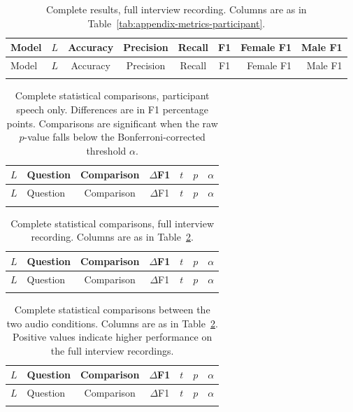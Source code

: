 \documentclass{mproj}
\begin{document}
{\small\setlength{\tabcolsep}{3pt}
\begin{longtable}{llccccrr}
  \caption{Complete results, full interview recording. Columns are as in
  Table~\ref{tab:appendix-metrics-participant}.}
  \label{tab:appendix-metrics-full} \\
  \toprule
  Model & $L$ & Accuracy & Precision & Recall & F1 & Female F1 & Male F1 \\
  \midrule
  \endfirsthead
  \toprule
  Model & $L$ & Accuracy & Precision & Recall & F1 & Female F1 & Male F1 \\
  \midrule
  \endhead
  \bottomrule
  \endfoot
  
\end{longtable}}


{\small\setlength{\tabcolsep}{3pt}
\begin{longtable}{llccccc}
  \caption{Complete statistical comparisons, participant speech only.
  Differences are in F1 percentage points. Comparisons are significant when the
  raw $p$-value falls below the Bonferroni-corrected threshold $\alpha$.}
  \label{tab:appendix-stats-participant} \\
  \toprule
  $L$ & Question & Comparison & $\Delta$F1 & $t$ & $p$ & $\alpha$ \\
  \midrule
  \endfirsthead
  \toprule
  $L$ & Question & Comparison & $\Delta$F1 & $t$ & $p$ & $\alpha$ \\
  \midrule
  \endhead
  \bottomrule
  \endfoot
  
\end{longtable}}


{\small\setlength{\tabcolsep}{3pt}
\begin{longtable}{llccccc}
  \caption{Complete statistical comparisons, full interview recording. Columns
  are as in Table~\ref{tab:appendix-stats-participant}.}
  \label{tab:appendix-stats-full} \\
  \toprule
  $L$ & Question & Comparison & $\Delta$F1 & $t$ & $p$ & $\alpha$ \\
  \midrule
  \endfirsthead
  \toprule
  $L$ & Question & Comparison & $\Delta$F1 & $t$ & $p$ & $\alpha$ \\
  \midrule
  \endhead
  \bottomrule
  \endfoot
  
\end{longtable}}

{\small\setlength{\tabcolsep}{3pt}
\begin{longtable}{llccccc}
  \caption{Complete statistical comparisons between the two audio conditions.
  Columns are as in Table~\ref{tab:appendix-stats-participant}. Positive values
  indicate higher performance on the full interview recordings.}
  \label{tab:appendix-stats-audio} \\
  \toprule
  $L$ & Question & Comparison & $\Delta$F1 & $t$ & $p$ & $\alpha$ \\
  \midrule
  \endfirsthead
  \toprule
  $L$ & Question & Comparison & $\Delta$F1 & $t$ & $p$ & $\alpha$ \\
  \midrule
  \endhead
  \bottomrule
  \endfoot
  
\end{longtable}}
\end{document}
